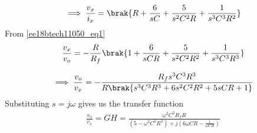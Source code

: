 \begin{enumerate}[label=\arabic*.,ref=\theenumi]
\begin{align}
    \implies\frac{v_x}{i_x} = \brak{R+\frac{6}{sC}+\frac{5}{s^2C^2R}+\frac{1}{s^3C^3R^2}}
\end{align}
From \eqref{ee18btech11050_eq1}
\begin{align}
    \frac{v_x}{v_o} = -\frac{R}{R_f}\brak{1+\frac{6}{sCR}+\frac{5}{s^2C^2R^2}+\frac{1}{s^3C^3R^3}}
\end{align}

\begin{align}
    \implies \frac{v_o}{v_x} = -\frac{R_fs^3C^3R^3}{R\brak{s^3C^3R^3+6s^2C^2R^2+5sCR+1}}
\end{align}
Substituting $s=j\omega$ gives us the transfer function
\begin{align}
    \frac{v_o}{v_x} = GH = \frac{\omega^2C^2R_fR}{(5-\omega^2C^2R^2)+j(6\omega CR-\frac{1}{\omega CR})}
    \label{ee18btech11050_eq2}
\end{align}


\end{enumerate}
